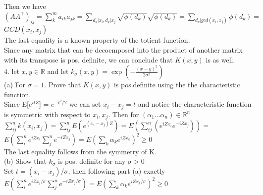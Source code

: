 \documentclass[18pt]{article}
\begin{document}
\begin{flushleft}
\vspace{.4cm}
Then we have\\
\vspace{.4cm}
$\left(A A^{\top}\right)_{ij} = \sum_k^m a_{ik} a_{jk}=\sum \limits_{d_k|x_i, d_k|x_j} \sqrt{\phi(d_k)}\sqrt{\phi(d_k)}=\sum\limits_{d_k|gcd(x_i,x_j)} \phi(d_k)=$\\
$GCD(x_i,x_j)$\\
\vspace{.4cm}
The last equality is a known property of the totient function.\\
\vspace{.4cm}
Since any matrix that can be decocmposed into the product of another matrix\\
with its transpose is pos. definite, we can conclude that $K(x,y)$ is as well.\\
\vspace{.4cm}
4. let $x,y\in \mathbb{R}$ and let $k_\sigma(x,y)=\exp \left(-\frac{(x-y)^2}{2 \sigma^2}\right)$\\
\vspace{.4cm}
(a) For $\sigma=1$. Prove that $K(x,y)$ is pos.definite using the the characteristic function.\\
\vspace{.4cm}
Since E[$e^{itZ}$] = $e^{-t^2/2}$ we can set $x_i-x_j=t$ and notice the characteristic function\\
is symmetric with respect to $x_i,x_j$. Then for $(\alpha_1...\alpha_n)\in\mathbb{R}^n$\\
\vspace{.4cm}
$\sum_{ij}^{n} k(x_i,x_j)=\sum_{ij}^{n} E \left(e^{(x_i-x_j)Z}\right) = E\left(\sum_{ij}^{n}(e^{iZx_i} e^{-iZx_j})\right)=$\\
$E\left(\sum_{i}^{n}e^{iZx_i}\sum_{j}^{n} e^{-iZx_j}\right)=E\left(\sum_k \alpha_k e^{iZx_k}\right)^2 \geq 0$\\
\vspace{.4cm}
The last equality follows from the symmetry of K.\\
(b) Show that $k_\sigma$ is pos. definite for any $\sigma >0$\\
\vspace{.4cm}
Set $t=(x_i-x_j)/\sigma$, then following part (a) exactly\\
$E\left(\sum_{i}^{n}e^{iZx_i/\sigma}\sum_{j}^{n} e^{-iZx_j/\sigma}\right)=E\left(\sum_k \alpha_k e^{iZx_k/\sigma}\right)^2 \geq 0$\\



\end{flushleft}
\end{document}
